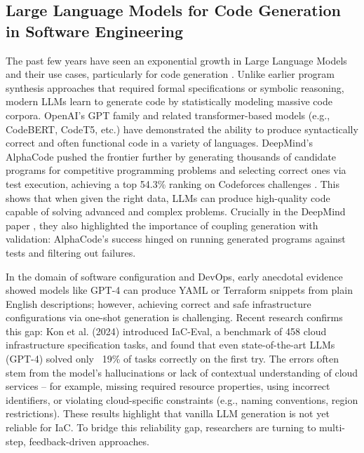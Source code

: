\documentclass[acmsmall,screen,review,anonymous]{acmart}
\begin{document}
\subsection{Large Language Models for Code Generation in Software Engineering}
The past few years have seen an exponential growth in Large Language Models and their use cases, particularly for code generation \cite{dong2025survey}. Unlike earlier program synthesis approaches that required formal specifications or symbolic reasoning, modern LLMs learn to generate code by statistically modeling massive code corpora. OpenAI’s GPT family and related transformer-based models (e.g., CodeBERT, CodeT5, etc.) have demonstrated the ability to produce syntactically correct and often functional code in a variety of languages. DeepMind’s AlphaCode pushed the frontier further by generating thousands of candidate programs for competitive programming problems and selecting correct ones via test execution, achieving a top 54.3\% ranking on Codeforces challenges \cite{li2022competition}. This shows that when given the right data, LLMs can produce high-quality code capable of solving advanced and complex problems. Crucially in the DeepMind paper \cite{li2022competition}, they also highlighted the importance of coupling generation with validation: AlphaCode’s success hinged on running generated programs against tests and filtering out failures. 

In the domain of software configuration and DevOps, early anecdotal evidence showed models like GPT-4 can produce YAML or Terraform snippets from plain English descriptions; however, achieving correct and safe infrastructure configurations via one-shot generation is challenging. Recent research confirms this gap: Kon et al. (2024) \cite{kon2024iac} introduced IaC-Eval, a benchmark of 458 cloud infrastructure specification tasks, and found that even state-of-the-art LLMs (GPT-4) solved only ~19\% of tasks correctly on the first try. The errors often stem from the model’s hallucinations or lack of contextual understanding of cloud services – for example, missing required resource properties, using incorrect identifiers, or violating cloud-specific constraints (e.g., naming conventions, region restrictions). These results highlight that vanilla LLM generation is not yet reliable for IaC. To bridge this reliability gap, researchers are turning to multi-step, feedback-driven approaches. 
\end{document}
